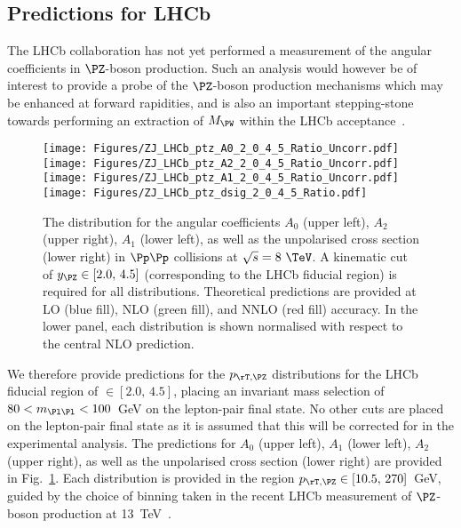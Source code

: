 \subsection{Predictions for LHCb}
The LHCb collaboration has not yet performed a measurement of the angular
coefficients in $\PZ$-boson production. Such an analysis would however be of interest to provide a
probe of the $\PZ$-boson production mechanisms which may be enhanced at forward rapidities, and is also an
important stepping-stone towards performing an extraction of $M_{\PW}$ within the LHCb acceptance~\cite{Bozzi:2015zja}. 
\begin{figure}
\centering
\texttt{[image: Figures/ZJ\_LHCb\_ptz\_A0\_2\_0\_4\_5\_Ratio\_Uncorr.pdf]} \hfill
\texttt{[image: Figures/ZJ\_LHCb\_ptz\_A2\_2\_0\_4\_5\_Ratio\_Uncorr.pdf]} \\
\texttt{[image: Figures/ZJ\_LHCb\_ptz\_A1\_2\_0\_4\_5\_Ratio\_Uncorr.pdf]} \hfill
\texttt{[image: Figures/ZJ\_LHCb\_ptz\_dsig\_2\_0\_4\_5\_Ratio.pdf]}
\caption{\small 
The \ptz distribution for the angular coefficients $A_0$ (upper left), $A_2$ (upper right),
$A_1$ (lower left), as well as the unpolarised cross section (lower right) in $\Pp\Pp$ collisions at $\sqrt{s} = 8~\TeV$.
A kinematic cut of $\yz \in [2.0,\,4.5]$ (corresponding to the LHCb fiducial region) is required for all distributions.
Theoretical predictions are provided at LO (blue fill), NLO (green fill), and NNLO (red fill) 
accuracy. In the lower panel, each distribution is shown normalised 
with respect to the central NLO prediction.
}
\label{fig:LHCb_1}
\end{figure}
We therefore provide predictions for the $\ptz$ distributions for the LHCb fiducial region of 
\yz $\in [2.0,\,4.5]$, placing an invariant mass selection of $80 < m_{\Pl\Pl} < 100$~GeV on the lepton-pair final state.
No other cuts are placed on the lepton-pair final state as it is assumed that this will be corrected for in 
the experimental analysis.
%
The predictions for $A_0$ (upper left), $A_1$ (lower left), $A_2$ (upper right), as well as
the unpolarised cross section (lower right) are provided in Fig.~\ref{fig:LHCb_1}. Each \ptz distribution 
is provided in the region $\ptz \in [10.5,\,270]$~GeV, guided by the choice of binning taken 
in the recent LHCb measurement of $\PZ$-boson production at 13~TeV~\cite{Aaij:2016mgv}.

